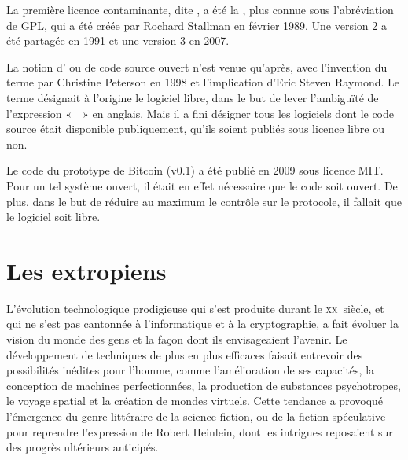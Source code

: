 La première licence contaminante, dite , a été la , plus connue sous l'abréviation de GPL, qui a été créée par Rochard Stallman en février 1989. Une version 2 a été partagée en 1991 et une version 3 en 2007.

La notion d' ou de code source ouvert n'est venue qu'après, avec l'invention du terme par Christine Peterson en 1998 et l'implication d'Eric Steven Raymond. Le terme désignait à l'origine le logiciel libre, dans le but de lever l'ambiguïté de l'expression «~~» en anglais. Mais il a fini désigner tous les logiciels dont le code source était disponible publiquement, qu'ils soient publiés sous licence libre ou non.

Le code du prototype de Bitcoin (v0.1) a été publié en 2009 sous licence MIT. Pour un tel système ouvert, il était en effet nécessaire que le code soit ouvert. De plus, dans le but de réduire au maximum le contrôle sur le protocole, il fallait que le logiciel soit libre.


\section*{Les extropiens}

L'évolution technologique prodigieuse qui s'est produite durant le \textsc{xx}\ieme{}~siècle, et qui ne s'est pas cantonnée à l'informatique et à la cryptographie, a fait évoluer la vision du monde des gens et la façon dont ils envisageaient l'avenir. Le développement de techniques de plus en plus efficaces faisait entrevoir des possibilités inédites pour l'homme, comme l'amélioration de ses capacités, la conception de machines perfectionnées, la production de substances psychotropes, le voyage spatial et la création de mondes virtuels. Cette tendance a provoqué l'émergence du genre littéraire de la science-fiction, ou de la fiction spéculative pour reprendre l'expression de Robert Heinlein, dont les intrigues reposaient sur des progrès ultérieurs anticipés.

